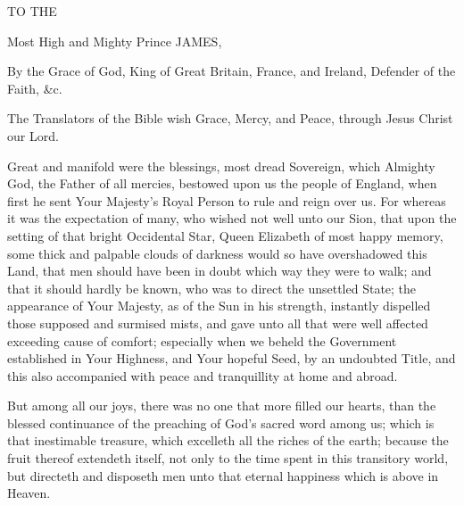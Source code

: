 {}

\begin{center}
    {\Large{TO THE}}
    \par
    {\LARGE{Most High and Mighty Prince JAMES,}}
    \par
    {\large{By the Grace of God, King of Great Britain, France, and Ireland, Defender of the Faith, \&c.}}
    \par
    {\large{The Translators of the Bible wish Grace, Mercy, and Peace, through Jesus Christ our Lord.}}
    \vspace{3mm}
    \par
\end{center}

\onehalfspacing

Great and manifold were the blessings, most dread Sovereign, which Almighty God, the Father of all mercies, bestowed upon us the people of England, when first he sent Your Majesty's Royal Person to rule and reign over us. For whereas it was the expectation of many, who wished not well unto our Sion, that upon the setting of that bright Occidental Star, Queen Elizabeth of most happy memory, some thick and palpable clouds of darkness would so have overshadowed this Land, that men should have been in doubt which way they were to walk; and that it should hardly be known, who was to direct the unsettled State; the appearance of Your Majesty, as of the Sun in his strength, instantly dispelled those supposed and surmised mists, and gave unto all that were well affected exceeding cause of comfort; especially when we beheld the Government established in Your Highness, and Your hopeful Seed, by an undoubted Title, and this also accompanied with peace and tranquillity at home and abroad.

But among all our joys, there was no one that more filled our hearts, than the blessed continuance of the preaching of God's sacred word among us; which is that inestimable treasure, which excelleth all the riches of the earth; because the fruit thereof extendeth itself, not only to the time spent in this transitory world, but directeth and disposeth men unto that eternal happiness which is above in Heaven.

